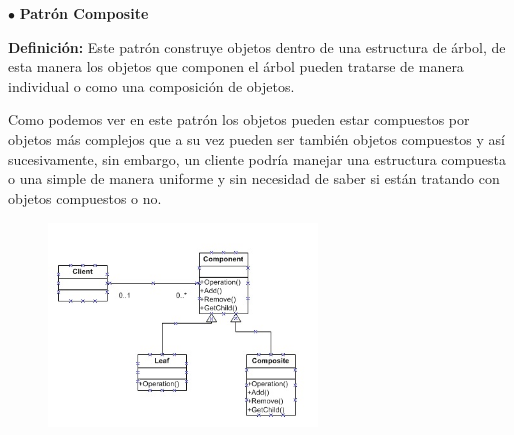 \documentclass[12pt]{article}
\begin{document}
\begin{multicols}{2}
\vspace{\baselineskip}

\vspace{\baselineskip}

\vspace{\baselineskip}

\vspace{\baselineskip}
{\fontsize{9pt}{10.8pt}\selectfont $\bullet$ \tab \textbf{ Patrón Composite}\par}\par


\vspace{\baselineskip}
{\fontsize{9pt}{10.8pt}\selectfont \textbf{Definición:} Este patrón construye objetos dentro de una estructura de árbol, de esta manera los objetos que componen el árbol pueden tratarse de manera individual o como una composición de objetos.\par}\par


\vspace{\baselineskip}
{\fontsize{9pt}{10.8pt}\selectfont  \par}\par


\vspace{\baselineskip}
{\fontsize{9pt}{10.8pt}\selectfont Como podemos ver en este patrón los objetos pueden estar compuestos por objetos más complejos que a su vez pueden ser también objetos compuestos y así sucesivamente, sin embargo, un cliente podría manejar una estructura compuesta o una simple de manera uniforme y sin necesidad de saber si están tratando con objetos compuestos o no.\par}\par




\begin{figure}[H]
	\begin{Center}
		\includegraphics[width=2.81in,height=2.14in]{./media/image10.png}
	\end{Center}
\end{figure}



\end{multicols}
\end{document}
